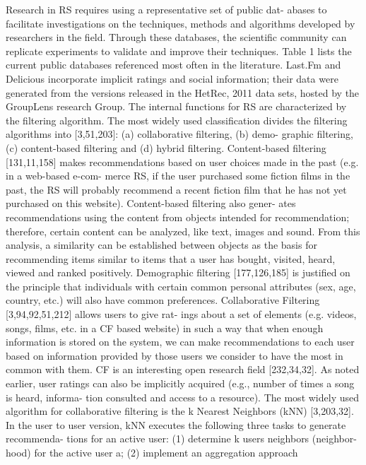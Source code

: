 \documentclass[11pt]{article}
\begin{document}
Research in RS requires using a representative set of public dat-
abases to facilitate investigations on the techniques, methods and
algorithms developed by researchers in the field. Through these
databases, the scientific community can replicate experiments to
validate and improve their techniques. Table 1 lists the current
public databases referenced most often in the literature. Last.Fm
and Delicious incorporate implicit ratings and social information;
their data were generated from the versions released in the HetRec,
2011 data sets, hosted by the GroupLens research Group.
The internal functions for RS are characterized by the filtering
algorithm. The most widely used classification divides the filtering
algorithms into [3,51,203]: (a) collaborative filtering, (b) demo-
graphic filtering, (c) content-based filtering and (d) hybrid filtering. Content-based filtering [131,11,158] makes recommendations
based on user choices made in the past (e.g. in a web-based e-com-
merce RS, if the user purchased some fiction films in the past, the
RS will probably recommend a recent fiction film that he has not
yet purchased on this website). Content-based filtering also gener-
ates recommendations using the content from objects intended for
recommendation; therefore, certain content can be analyzed, like
text, images and sound. From this analysis, a similarity can be
established between objects as the basis for recommending items
similar to items that a user has bought, visited, heard, viewed
and ranked positively.
Demographic filtering [177,126,185] is justified on the principle
that individuals with certain common personal attributes (sex,
age, country, etc.) will also have common preferences.
Collaborative Filtering [3,94,92,51,212] allows users to give rat-
ings about a set of elements (e.g. videos, songs, films, etc. in a CF
based website) in such a way that when enough information is
stored on the system, we can make recommendations to each user
based on information provided by those users we consider to have
the most in common with them. CF is an interesting open research
field [232,34,32]. As noted earlier, user ratings can also be implicitly acquired (e.g., number of times a song is heard, informa-
tion consulted and access to a resource).
The most widely used algorithm for collaborative filtering is the
k Nearest Neighbors (kNN) [3,203,32]. In the user to user version,
kNN executes the following three tasks to generate recommenda-
tions for an active user: (1) determine k users neighbors (neighbor-
hood) for the active user a; (2) implement an aggregation approach
\end{document}
